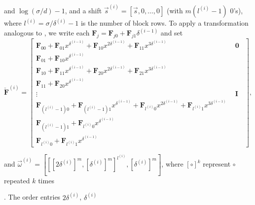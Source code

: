 {} and $\log\left(\sigma/d\right)-1$, and a shift $\vec{s}^{\left(i\right)}=[\vec{s},0,\dots,0]$
(with $m(l^{\left(i\right)}-1)$ 0's), where $l^{\left(i\right)}=\sigma/\delta^{\left(i\right)}-1$
is the number of block rows. To apply a transformation analogous to
, we write each $\mathbf{F}_{j}=\mathbf{F}_{j0}+\mathbf{F}_{j1}\delta^{\left(i-1\right)}$
and set \begin{equation}
\check{\mathbf{F}}^{\left(i\right)}=\left[\begin{array}{l|c}
\mathbf{F}_{00}+\mathbf{F}_{01}x^{\delta^{\left(i-1\right)}}+\mathbf{F}_{10}x^{2\delta^{\left(i-1\right)}}+\mathbf{F}_{11}x^{3\delta^{\left(i-1\right)}} & ~~\mathbf{0}~~\\
\hline \mathbf{F}_{01}+\mathbf{F}_{10}x^{\delta^{\left(i-1\right)}}\\
\mathbf{F}_{10}+\mathbf{F}_{11}x^{\delta^{\left(i-1\right)}}+\mathbf{F}_{20}x^{2\delta^{\left(i-1\right)}}+\mathbf{F}_{21}x^{3\delta^{\left(i-1\right)}}\\
\mathbf{F}_{11}+\mathbf{F}_{20}x^{\delta^{\left(i-1\right)}}\\
\vdots & ~~\mathbf{I}~~\\
\mathbf{F}_{\left(l^{\left(i\right)}-1\right)0}+\mathbf{F}_{\left(l^{\left(i\right)}-1\right)1}x^{\delta^{\left(i-1\right)}}+\mathbf{F}_{l^{\left(i\right)}0}x^{2\delta^{\left(i-1\right)}}+\mathbf{F}_{l^{\left(i\right)}1}x^{3\delta^{\left(i-1\right)}}\\
\mathbf{F}_{\left(l^{\left(i\right)}-1\right)1}+\mathbf{F}_{l^{\left(i\right)}0}x^{\delta^{\left(i-1\right)}}\\
\mathbf{F}_{l^{\left(i\right)}0}+\mathbf{F}_{l^{\left(i\right)}1}x^{\delta^{\left(i-1\right)}}\end{array}\right],\label{eq:extendedStorjohannTransform}\end{equation}
\begin{comment}
This is not ideal, but no better idea. 
\end{comment}
{} and $\vec{\omega}^{\left(i\right)}=\left[\left[[2\delta^{\left(i\right)}]^{m},[\delta^{\left(i\right)}]^{m}\right]^{l^{\left(i\right)}},[\delta^{\left(i\right)}]^{m}\right]$,
where $\left[\circ\right]^{k}$ represent $\circ$ repeated $k$ times%
\begin{comment}
Not sure if using this notation is a good thing to do, but it saves
space and makes presentation easier 
\end{comment}
{}. The order entries $2\delta^{\left(i\right)}$, $\delta^{\left(i\right)}$

